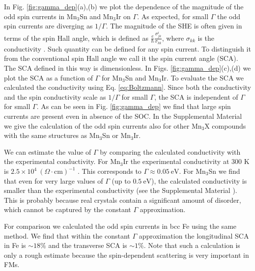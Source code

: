 \documentclass[aps,prl,reprint,amsmath,amssymb,superscriptaddress]{revtex4-1}
\begin{document}
In Fig. \ref{fig:gamma_dep}(a),(b) we plot the dependence of the magnitude of the odd spin currents in Mn$_3$Sn and Mn$_3$Ir on $\Gamma$. As expected, for small $\Gamma$ the odd spin currents are diverging as $1/\Gamma$. 
The magnitude of the SHE is often given in terms of the spin Hall angle, which is defined as $\frac{e}{\hbar}\frac{\sigma^i_{jk}}{\sigma_{kk}}$, where $\sigma_{kk}$ is the conductivity \cite{Hoffmann2013}. Such quantity can be defined for any spin current. To distinguish it from the conventional spin Hall angle we call it the spin current angle (SCA). The SCA defined in this way is dimensionless. In Figs. \ref{fig:gamma_dep}(c),(d) we plot the SCA as a function of $\Gamma$ for Mn$_3$Sn and Mn$_3$Ir. To evaluate the SCA we calculated the conductivity using Eq. \eqref{eq:Boltzmann}. Since both the conductivity and the spin conductivity scale as $1/\Gamma$ for small $\Gamma$, the SCA is independent of $\Gamma$ for small $\Gamma$. As can be seen in Fig. \ref{fig:gamma_dep} we find that  large spin currents are present even in absence of the SOC. In the Supplemental Material \cite{SMprl} we give the calculation of the odd spin currents also for other Mn$_3$X compounds with the same structures as Mn$_3$Sn or Mn$_3$Ir.

We can estimate  the value of $\Gamma$ by comparing the calculated conductivity with the experimental conductivity. For Mn$_3$Ir the experimental conductivity at 300 K is $2.5\times 10^4\  (\Omega\cdot \text{cm})^{-1}$ \cite{Yamaoka1974}. This corresponds to $\Gamma \approx 0.05\ \text{eV}$. For Mn$_3$Sn we find that even for very large values of $\Gamma$ (up to $0.5\ \text{eV}$), the calculated conductivity is smaller than the experimental conductivity (see the Supplemental Material \cite{SMprl}). This is probably because real crystals contain a significant amount of disorder, which cannot be captured by the constant $\Gamma$ approximation.  

For comparison we calculated the odd spin currents in bcc Fe using the same method. We find that within the constant $\Gamma$ approximation the longitudinal SCA in Fe is $\sim18\%$ and the transverse SCA is $\sim 1\%$. Note that such a calculation is only a rough estimate because the spin-dependent scattering is very important in FMs. 
\end{document}
